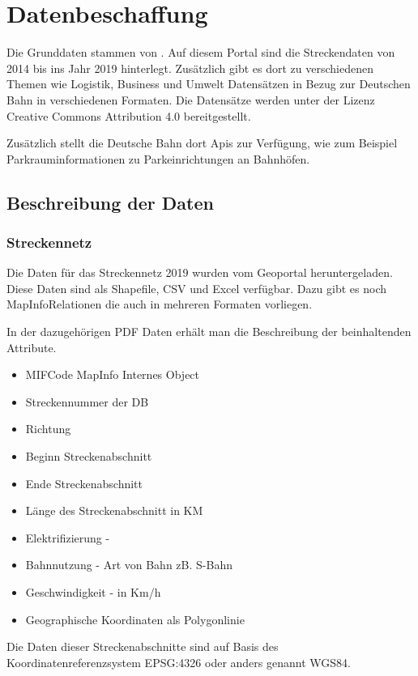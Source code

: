 \section{Datenbeschaffung}

Die Grunddaten stammen von \cite{dbgeodaten}. Auf diesem Portal sind die Streckendaten von 2014 bis ins Jahr 2019 hinterlegt. Zusätzlich gibt es dort zu verschiedenen Themen wie Logistik, Business und Umwelt Datensätzen in Bezug zur Deutschen Bahn in verschiedenen Formaten. Die Datensätze werden unter der Lizenz Creative Commons Attribution 4.0 bereitgestellt.

Zusätzlich stellt die Deutsche Bahn dort Apis zur Verfügung, wie zum Beispiel Parkrauminformationen zu Parkeinrichtungen an Bahnhöfen.
\subsection{Beschreibung der Daten}
\subsubsection{Streckennetz}

Die Daten für das Streckennetz 2019 wurden vom Geoportal heruntergeladen. \cite{geodaten}
Diese Daten sind als Shapefile, CSV und Excel verfügbar. Dazu gibt es noch MapInfoRelationen die auch in mehreren Formaten vorliegen.

In der dazugehörigen PDF Daten erhält man die Beschreibung der beinhaltenden Attribute.
\begin{itemize}
	\item MIFCode MapInfo Internes Object
	\item Streckennummer der DB
	\item Richtung 
	\item Beginn Streckenabschnitt
	\item Ende Streckenabschnitt
	\item Länge des Streckenabschnitt in KM
	\item Elektrifizierung - 
	\item Bahnnutzung - Art von Bahn zB. S-Bahn
	\item Geschwindigkeit - in Km/h
	\item Geographische Koordinaten als Polygonlinie
\end{itemize}

Die Daten dieser Streckenabschnitte sind auf Basis des Koordinatenreferenzsystem EPSG:4326 oder anders genannt WGS84.
